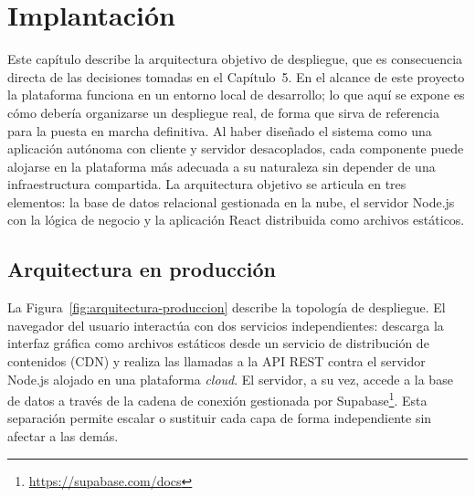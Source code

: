 \documentclass[11pt,oneside,spanish,listoffigures,listoftables]{tfgetsinf}
\begin{document}
\chapter{Implantación}

Este capítulo describe la arquitectura objetivo de despliegue, que es consecuencia directa de las decisiones tomadas en el Capítulo~5. En el alcance de este proyecto la plataforma funciona en un entorno local de desarrollo; lo que aquí se expone es cómo debería organizarse un despliegue real, de forma que sirva de referencia para la puesta en marcha definitiva. Al haber diseñado el sistema como una aplicación autónoma con cliente y servidor desacoplados, cada componente puede alojarse en la plataforma más adecuada a su naturaleza sin depender de una infraestructura compartida. La arquitectura objetivo se articula en tres elementos: la base de datos relacional gestionada en la nube, el servidor Node.js con la lógica de negocio y la aplicación React distribuida como archivos estáticos.

\section{Arquitectura en producción}

La Figura~\ref{fig:arquitectura-produccion} describe la topología de despliegue. El navegador del usuario interactúa con dos servicios independientes: descarga la interfaz gráfica como archivos estáticos desde un servicio de distribución de contenidos (CDN) y realiza las llamadas a la API REST contra el servidor Node.js alojado en una plataforma \textit{cloud}. El servidor, a su vez, accede a la base de datos a través de la cadena de conexión gestionada por Supabase\footnote{\url{https://supabase.com/docs}}. Esta separación permite escalar o sustituir cada capa de forma independiente sin afectar a las demás.
\end{document}
